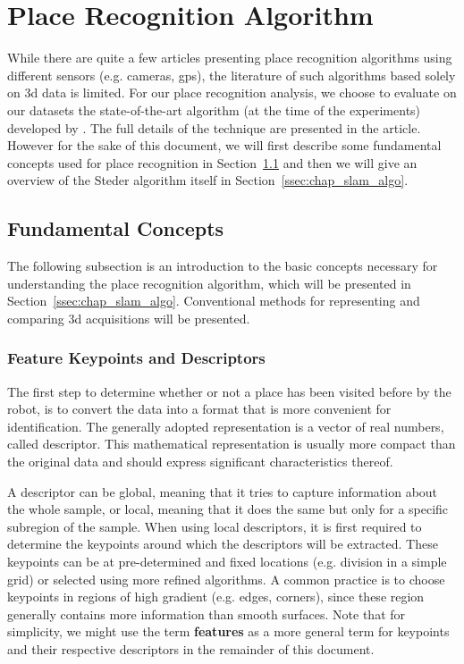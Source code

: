 \section{Place Recognition Algorithm}
\label{sec:chap_slam_algo}

While there are quite a few articles presenting place recognition algorithms using different sensors (e.g. cameras, \gls*{gps}), the literature of such algorithms based solely on \gls*{3d} data is limited. For our place recognition analysis, we choose to evaluate on our datasets the state-of-the-art algorithm (at the time of the experiments) developed by \citet{Steder2011b}. The full details of the technique are presented in the article. However for the sake of this document, we will first describe some fundamental concepts used for place recognition in Section~\ref{ssec:chap_slam_basics} and then we will give an overview of the Steder algorithm itself in Section~\ref{ssec:chap_slam_algo}.


\subsection{Fundamental Concepts}
\label{ssec:chap_slam_basics}

The following subsection is an introduction to the basic concepts necessary for understanding the place recognition algorithm, which will be presented in Section~\ref{ssec:chap_slam_algo}. Conventional methods for representing and comparing \gls*{3d} acquisitions will be presented. 

\subsubsection{Feature Keypoints and Descriptors}
\label{ssub:feature_keypoints_and_descriptors}

The first step to determine whether or not a place has been visited before by the robot, is to convert the data into a format that is more convenient for identification. The generally adopted representation is a vector of real numbers, called descriptor. This mathematical representation is usually more compact than the original data and should express significant characteristics thereof.

A descriptor can be global, meaning that it tries to capture information about the whole sample, or local, meaning that it does the same but only for a specific subregion of the sample. When using local descriptors, it is first required to determine the keypoints around which the descriptors will be extracted. These keypoints can be at pre-determined and fixed locations (e.g. division in a simple grid) or selected using more refined algorithms. A common practice is to choose keypoints in regions of high gradient (e.g. edges, corners), since these region generally contains more information than smooth surfaces. Note that for simplicity, we might use the term \textbf{features} as a more general term for keypoints and their respective descriptors in the remainder of this document.

